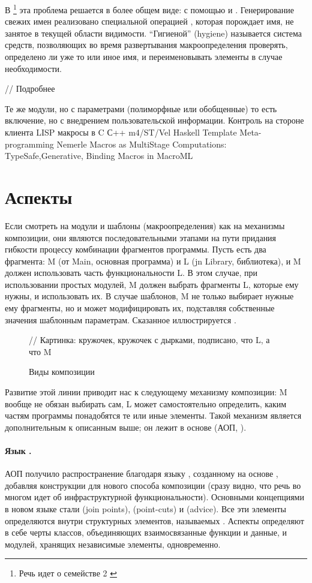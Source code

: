 В \footnote{Речь идет о семействе  2 \cite{???}} эта проблема решается в более общем виде: с помощью  и . Генерирование свежих имен реализовано специальной операцией , которая порождает имя, не занятое в текущей области видимости. ``Гигиеной'' (hygiene) называется система средств, позволяющих во время развертывания макроопределения проверять, определено ли уже то или иное имя, и переименовывать элементы в случае необходимости.

// Подробнее



Те же модули, но с параметрами (полиморфные или обобщенные)
	то есть включение, но с внедрением пользовательской информации. Контроль на стороне клиента
	LISP
	макросы в C
	С++
	m4/ST/Vel
	Haskell Template Meta-programming
	Nemerle
	Macros as MultiStage Computations: TypeSafe,Generative, Binding Macros in MacroML
	
\section{Аспекты}

Если смотреть на модули и шаблоны (макроопределения) как на механизмы композиции, они являются последовательными этапами на пути придания гибкости процессу комбинации фрагментов программы. Пусть есть два фрагмента: M (от Main, основная программа) и L (jn Library, библиотека), и M должен использовать часть функциональности L. В этом случае, при использовании простых модулей, M должен выбрать фрагменты L, которые ему нужны, и использовать их. В случае шаблонов, M не только выбирает нужные ему фрагменты, но и может модифицировать их, подставляя собственные значения шаблонным параметрам. Сказанное иллюстрируется .

\begin{figure}[htbp]
// Картинка: кружочек, кружочек с дырками, подписано, что L, а что M
\caption{Виды композиции}\label{Composition}
\end{figure}

Развитие этой линии приводит нас к следующему механизму композиции: M вообще не обязан выбирать сам, L может самостоятельно определить, каким частям программы понадобятся те или иные элементы. Такой механизм является дополнительным к описанным выше; он лежит в основе  (АОП, \cite{???}).

\paragraph*{Язык .} АОП получило распространение благодаря языку  \cite{???}, созданному на основе , добавляя конструкции для нового способа композиции (сразу видно, что речь во многом идет об инфраструктурной функциональности). Основными концепциями в новом языке стали  (join points),  (point-cuts) и  (advice). Все эти элементы определяются внутри структурных элементов, называемых . Аспекты определяют в себе черты классов, объединяющих взаимосвязанные функции и данные, и модулей, хранящих независимые элементы, одновременно.

